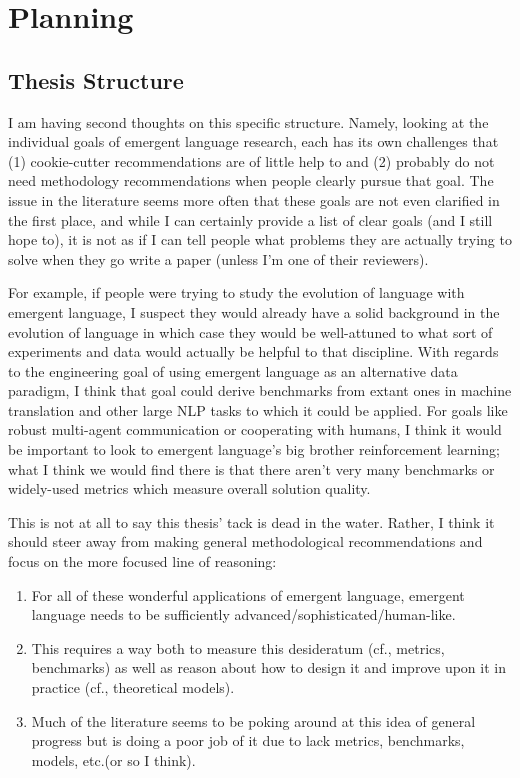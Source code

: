 \setcounter{chapter}{-1}
\chapter{Planning}

\section{Thesis Structure}
I am having second thoughts on this  specific structure.
Namely, looking at the individual goals of emergent language research, each has its own challenges that (1) cookie-cutter recommendations are of little help to and (2) probably do not need methodology recommendations when people clearly pursue that goal.
The issue in the literature seems more often that these goals are not even clarified in the first place, and while I can certainly provide a list of clear goals (and I still hope to), it is not as if I can tell people what problems they are actually trying to solve when they go write a paper (unless I'm one of their reviewers).

For example, if people were trying to study the evolution of language with emergent language, I suspect they would already have a solid background in the evolution of language in which case they would be well-attuned to what sort of experiments and data would actually be helpful to that discipline.
With regards to the engineering goal of using emergent language as an alternative data paradigm, I think that goal could derive benchmarks from extant ones in machine translation and other large NLP tasks to which it could be applied.
For goals like robust multi-agent communication or cooperating with humans, I think it would be important to look to emergent language's big brother reinforcement learning; what I think we would find there is that there aren't very many benchmarks or widely-used metrics which measure overall solution quality.

This is not at all to say this thesis' tack is dead in the water.
Rather, I think it should steer away from making general methodological recommendations and focus on the more focused line of reasoning:
\begin{enumerate}
    \item For all of these wonderful applications of emergent language, emergent language needs to be sufficiently advanced/sophisticated/human-like.
    \item This requires a way both to measure this desideratum (cf., metrics, benchmarks) as well as reason about how to design it and improve upon it in practice (cf., theoretical models).
    \item Much of the literature seems to be poking around at this idea of general progress but is doing a poor job of it due to lack metrics, benchmarks, models, etc.\@ (or so I think).
\end{enumerate}




